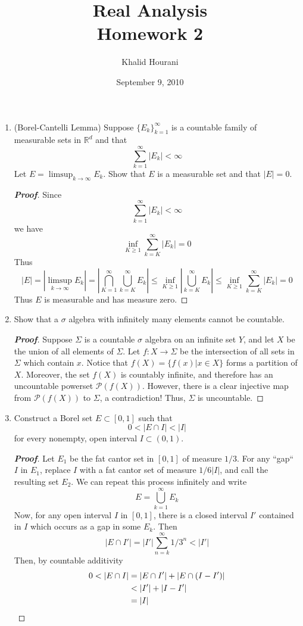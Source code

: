 \documentclass[12pt,leqno]{book}
\title{Real Analysis\\\large Homework 2}
\date{September 9, 2010}
\author{Khalid Hourani}
\theoremstyle{definition}
\newcommand{\R}{\mathbb{R}}
\newenvironment{Proof}{\begin{proof}[\textnormal{\textbf{Proof}}]}{\end{proof}}
\begin{document}
\begin{titlepage}
 \maketitle 
\end{titlepage}

\begin{enumerate}
  \item (Borel-Cantelli Lemma) Suppose $\{E_k\}_{k=1}^{\infty}$ is a countable family of measurable sets in $\R^d$ and that \[\sum_{k=1}^{\infty}|E_k|<\infty\] Let $E=\displaystyle\limsup_{k\to\infty}E_k$. Show that $E$ is a measurable set and that $|E|=0$.
\begin{Proof}
Since \[\sum_{k=1}^{\infty}|E_k|<\infty\] we have \[\inf_{K\geq1}\sum_{k=K}^{\infty}|E_k|=0\] Thus
\[|E|=|\limsup_{k\to\infty}E_k|=\left|\bigcap_{K=1}^{\infty}\bigcup_{k=K}^{\infty}E_k\right|\leq\inf_{K\geq1}\left|\bigcup_{k=K}^{\infty}E_k\right|\leq\inf_{K\geq1}\sum_{k=K}^{\infty}|E_k|=0\] Thus $E$ is measurable and has measure zero.
\end{Proof}

  \item Show that a $\sigma$ algebra with infinitely many elements cannot be countable.
  \begin{Proof}
   Suppose $\Sigma$ is a countable $\sigma$ algebra on an infinite set $Y$, and let $X$ be the union of all elements of $\Sigma$. Let $f:X\to \Sigma$ be the intersection of all sets in $\Sigma$ which contain $x$. Notice that $f(X)=\{f(x)|x\in X\}$ forms a partition of $X$. Moreover, the set $f(X)$ is countably infinite, and therefore has an uncountable powerset $\mathcal{P}(f(X))$. However, there is a clear injective map from $\mathcal{P}(f(X))$ to $\Sigma$, a contradiction! Thus, $\Sigma$ is uncountable.
  \end{Proof}

  \item Construct a Borel set $E\subset[0,1]$ such that \[0<|E\cap I|<|I|\] for every nonempty, open interval $I\subset(0,1)$.
\begin{Proof}
 Let $E_1$ be the fat cantor set in $[0,1]$ of measure $1/3$. For any ``gap`` $I$ in $E_1$, replace $I$ with a fat cantor set of measure $1/6|I|$, and call the resulting set $E_2$. We can repeat this process infinitely and write \[E=\bigcup_{k=1}^{\infty}E_k\] Now, for any open interval $I$ in $[0,1]$, there is a closed interval $I'$ contained in $I$ which occurs as a gap in some $E_k$. Then \[|E\cap I'|=|I'|\sum_{n=k}^{\infty}1/3^n<|I'|\] Then, by countable additivity \begin{align*}0<|E\cap I|&=|E\cap I'|+|E\cap(I-I')|\\&<|I'|+|I-I'|\\&=|I|\qedhere\end{align*}
\end{Proof}


\end{enumerate}
\end{document}
